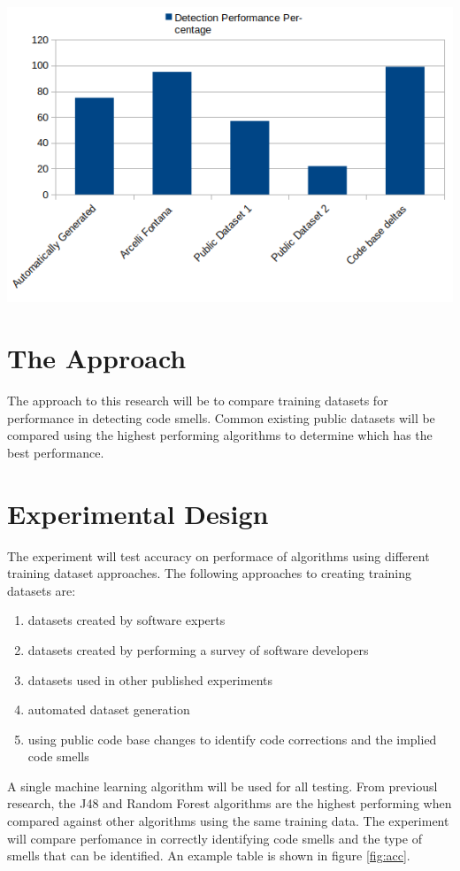 \documentclass[conference]{IEEEtran}
\begin{document}
\begin{center}
\includegraphics[width=\columnwidth]{teaser.png}
\label{fig:ts}%
\end{center}


\section{The Approach}
The approach to this research will be to compare training datasets for performance in detecting code smells.
Common existing public datasets will be compared using the highest performing algorithms to determine which has the best performance.

\section{Experimental Design}
The experiment will test accuracy on performace of algorithms using different training dataset approaches.
The following approaches to creating training datasets are: 
\begin{enumerate}
\item datasets created by software experts
\item datasets created by performing a survey of software developers 
\item datasets used in other published experiments
\item automated dataset generation
\item using public code base changes to identify code corrections and the implied code smells
\end{enumerate}
A single machine learning algorithm will be used for all testing. 
From previousl research\cite{arcelli_fontana_comparing_2016}, the J48 and Random Forest algorithms are the highest performing when compared against other algorithms using the same training data.
The experiment will compare perfomance in correctly identifying code smells and the type of smells that can be identified. 
An example table is shown in figure \ref{fig:acc}.
\end{document}
